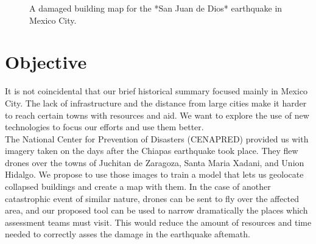 \begin{figure}[h]
  \begin{center}
  \end{center}
  \caption{A damaged building map for the *San Juan de Dios* earthquake in Mexico City.}
  \label{fig:quake1800}
\end{figure}


\section{Objective}

It is not coincidental that our brief historical summary focused mainly in Mexico City. The lack of infrastructure and the distance from large cities make it harder to reach certain towns with resources and aid. We want to explore the use of new technologies to focus our efforts and use them better.\\

The National Center for Prevention of Disasters (CENAPRED) provided us with imagery taken on the days after the Chiapas earthquake took place. They flew drones over the towns of Juchitan de Zaragoza, Santa Maria Xadani, and Union Hidalgo. We propose to use those images to train a model that lets us geolocate collapsed buildings and create a map with them. In the case of another catastrophic event of similar nature, drones can be sent to fly over the affected area, and our proposed tool can be used to narrow dramatically the places which assessment teams must visit. This would reduce the amount of resources and time needed to correctly asses the damage in the earthquake aftemath.\\

